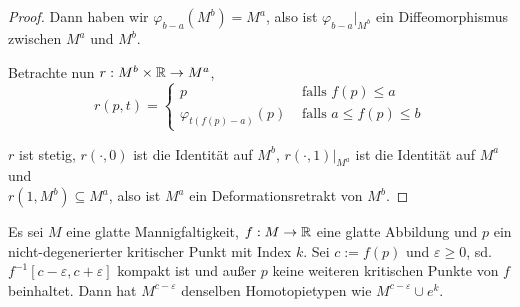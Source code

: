 \begin{proof}
    Dann haben wir $\varphi_{b - a} (M^b) = M^a$, also ist $\varphi_{b - a}|_{M^b}$ ein 
    Diffeomorphismus zwischen $M^a$ und $M^b$. 

    Betrachte nun $r: M^b \times { \mathbb R } \to M^a$,
    \[  
        r(p, t) = \begin{cases}
            p & \text{ falls }  f(p) \leq a \\
            \varphi_{t(f(p) - a)}(p) & \text{ falls } a \leq f(p) \leq b 
        \end{cases}
    \]

    $r$ ist stetig, $r(\cdot, 0)$ ist die Identität auf $M^b$, $r(\cdot, 1)|_{M^a}$ ist die 
    Identität auf $M^a$ und \\ $r(1, M^b) \subseteq M^a$, also ist $M^a$ ein Deformationsretrakt 
    von 
    $M^b$.
\end{proof}

\begin{theorem}
    \label{satz: zweites deformationslemma}
    Es sei $M$ eine glatte Mannigfaltigkeit, $f: M \rightarrow { \mathbb R }$ eine glatte
    Abbildung und $p$ ein nicht-degenerierter kritischer Punkt mit Index 
    $k$. Sei $c := f(p)$ und $\varepsilon \geq 0$, sd. 
    $f^{-1}[c - \varepsilon, c + \varepsilon]$ kompakt ist und außer $p$ keine 
    weiteren kritischen Punkte von $f$ beinhaltet. Dann hat $M^{c-\varepsilon}$
    denselben Homotopietypen wie $M^{c - \varepsilon} \cup e^k$.
\end{theorem}

